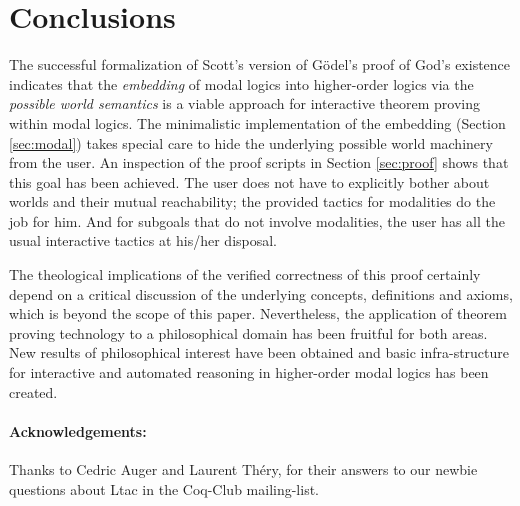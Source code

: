 \documentclass{llncs}
\begin{document}
\section{Conclusions}
\label{sec:conclusions}

The successful formalization of Scott's version of G\"odel's proof of 
God's existence indicates that the 
\emph{embedding} of modal logics 
into higher-order logics via the \emph{possible world semantics} is a viable approach for interactive 
theorem proving within modal logics.
The minimalistic implementation of the embedding 
(Section \ref{sec:modal}) takes special care to hide the 
underlying possible world machinery from the user. 
An inspection of the proof scripts in Section \ref{sec:proof} shows 
that this goal has been achieved. The user does not have to 
explicitly bother about worlds and their mutual reachability; 
the provided tactics for modalities do the job for him. 
And for subgoals that do not involve modalities, 
the user has all the usual interactive tactics at his/her disposal. 

The theological implications of the verified correctness of 
this proof certainly depend on a critical discussion of the 
underlying concepts, definitions and axioms, 
which is beyond the scope of this paper. Nevertheless, the application
of theorem proving technology to a philosophical domain 
has been fruitful for both areas. New results of philosophical 
interest have been obtained \cite{ToDo:our ArXiv or Journal abstract} 
and basic infra-structure for interactive and automated reasoning 
in higher-order modal logics has been created.


\paragraph{Acknowledgements:} Thanks to Cedric Auger and Laurent Th\'ery, for their answers to our newbie questions about Ltac in the Coq-Club mailing-list. 
\end{document}
